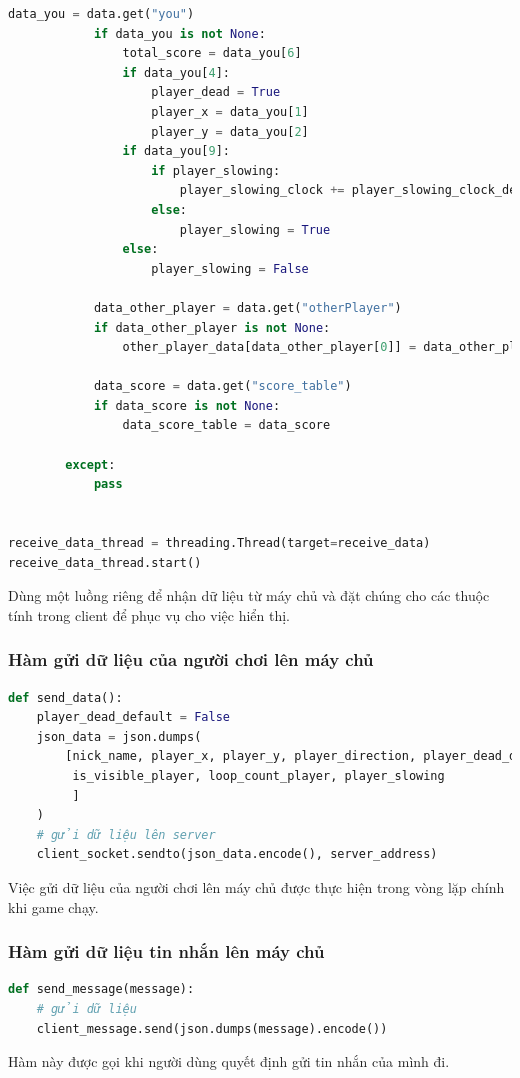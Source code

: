 \documentclass[a4paper]{article}
\begin{document}
\begin{lstlisting}[language=Python]
            data_you = data.get("you")
            if data_you is not None:
                total_score = data_you[6]
                if data_you[4]:
                    player_dead = True
                    player_x = data_you[1]
                    player_y = data_you[2]
                if data_you[9]:
                    if player_slowing:
                        player_slowing_clock += player_slowing_clock_default
                    else:
                        player_slowing = True
                else:
                    player_slowing = False

            data_other_player = data.get("otherPlayer")
            if data_other_player is not None:
                other_player_data[data_other_player[0]] = data_other_player

            data_score = data.get("score_table")
            if data_score is not None:
                data_score_table = data_score

        except:
            pass


receive_data_thread = threading.Thread(target=receive_data)
receive_data_thread.start()
\end{lstlisting}
Dùng một luồng riêng để nhận dữ liệu từ máy chủ và đặt chúng cho các thuộc tính trong client để phục vụ cho việc hiển thị.

\subsubsection{Hàm gửi dữ liệu của người chơi lên máy chủ}
\begin{lstlisting}[language=Python]
def send_data():
    player_dead_default = False
    json_data = json.dumps(
        [nick_name, player_x, player_y, player_direction, player_dead_default, is_flickering_player, total_score,
         is_visible_player, loop_count_player, player_slowing
         ]
    )
    # gửi dữ liệu lên server
    client_socket.sendto(json_data.encode(), server_address)
\end{lstlisting}
Việc gửi dữ liệu của người chơi lên máy chủ được thực hiện trong vòng lặp chính khi game chạy.

\subsubsection{Hàm gửi dữ liệu tin nhắn lên máy chủ}
\begin{lstlisting}[language=Python]
def send_message(message):
    # gửi dữ liệu
    client_message.send(json.dumps(message).encode())
\end{lstlisting}
Hàm này được gọi khi người dùng quyết định gửi tin nhắn của mình đi.
\end{document}
